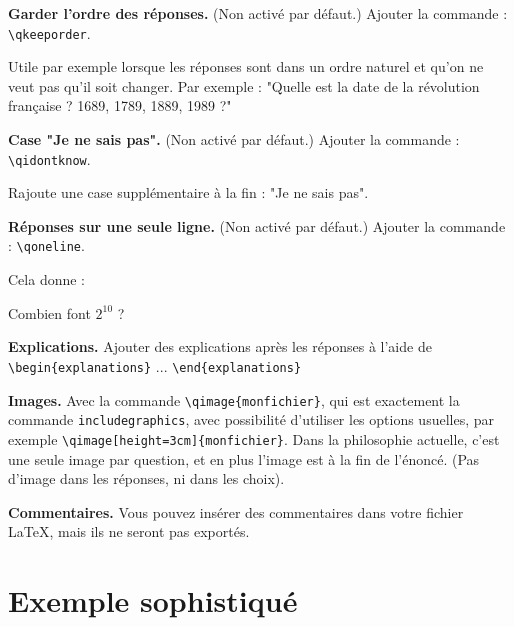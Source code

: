 \documentclass[12pt,a4paper]{article}
\begin{document}
\bigskip
\textbf{Garder l'ordre des réponses.} (Non activé par défaut.) Ajouter la commande : \verb|\qkeeporder|. 

Utile par exemple lorsque les réponses sont dans un ordre naturel et qu'on ne veut pas qu'il soit changer. Par exemple : "Quelle est la date de la révolution française ? 1689, 1789, 1889, 1989 ?" 

\bigskip
\textbf{Case "Je ne sais pas".} (Non activé par défaut.) Ajouter la commande : \verb|\qidontknow|.

Rajoute une case supplémentaire à la fin : "Je ne sais pas".


\bigskip
\textbf{Réponses sur une seule ligne.} (Non activé par défaut.) Ajouter la commande : \verb|\qoneline|.

Cela donne :
\begin{center}
\begin{minipage}{0.8\textwidth}
\begin{question}
\qoneline
Combien font $2^{10}$ ?
\begin{answers}
\end{answers}
\end{question}
\end{minipage}
\end{center}

\bigskip
\textbf{Explications.} Ajouter des explications après les réponses à l'aide de
\verb|\begin{explanations}| ... \verb|\end{explanations}|

\bigskip
\textbf{Images.} Avec la commande \verb|\qimage{monfichier}|, qui est exactement la commande \verb|includegraphics|, avec possibilité d'utiliser les options usuelles, par exemple \verb|\qimage[height=3cm]{monfichier}|.
Dans la philosophie actuelle, c'est une seule image par question, et en plus l'image est à la fin de l'énoncé. (Pas d'image dans les réponses, ni dans les choix).

\bigskip
\textbf{Commentaires.} Vous pouvez insérer des commentaires dans votre fichier \LaTeX, mais ils ne seront pas exportés. 



\section{Exemple sophistiqué}
\end{document}
